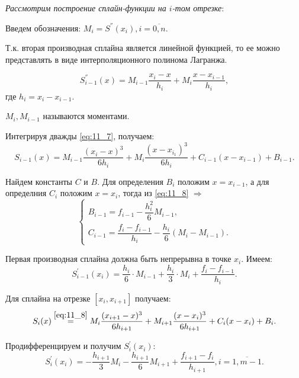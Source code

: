 \textit{Рассмотрим построение сплайн-функции на $i$-том отрезке}:

Введем обозначения: $M_i = S^{''}(x_i), i = \overline{0, n}$.

Т.к. вторая производная сплайна является линейной функцией, то ее можно представлять в виде интерполяционного полинома Лагранжа.

\begin{equation}\label{eq:11_7}
  S^{''}_{i - 1} (x) = M_{i - 1} \dfrac{x_i - x}{h_i} + M_i \dfrac{x - x_{i -1}}{h_i},
\end{equation}
где $h_i = x_i - x_{i - 1}$.

$M_i, M_{i - 1}$ называются моментами.

Интегрируя дважды \eqref{eq:11_7}, получаем:
\begin{equation}\label{eq:11_8}
  S_{i - 1}(x) = M_{i - 1} \dfrac{(x_i - x)^3}{6 h_i} + M_i \dfrac{(x - x_{i_1})^3}{6 h_i} +  C_{i - 1} (x - x_{i - 1}) + B_{i - 1}.
\end{equation}

Найдем константы $C$ и $B$. Для определения $B_i$ положим $x = x_{i - 1}$, а для определния $C_i$ положим $x = x_{i}$, тогда из \eqref{eq:11_8} $\Rightarrow$
\begin{equation*}
  \begin{cases} B_{i - 1} = f_{i - 1} - \dfrac{h_i^2}{6} M_{i - 1}, \\ C_{i - 1} = \dfrac{f_i - f_{i - 1}}{h_i} - \dfrac{h_i}{6}(M_i - M_{i - 1}). \end{cases}
\end{equation*}

Первая производная сплайна должна быть непрерывна в точке $x_i$. Имеем:
\begin{equation}\label{eq:11_9}
  S^{'}_{i - 1}(x_i) = \dfrac{h_i}{6} \cdot M_{i - 1} + \dfrac{h_i}{3} \cdot M_i + \dfrac{f_i - f_{i - 1}}{h_i}.
\end{equation}

Для сплайна на отрезке $[x_i, x_{i+1}]$ получаем:
\begin{equation*}
  S_{i}(x) \overset{\eqref{eq:11_8}}{=} M_i \dfrac{(x_{i+1} - x)^3}{6 h_{i+1}} + M_{i+1} \dfrac{(x - x_i)^3}{6 h_{i+1}} +  C_i (x - x_i) + B_i.
\end{equation*}

Продифференцируем и получим $S^{'}_{i}(x_i)$:
\begin{equation}\label{eq:11_10}
  S^{'}_{i}(x_i) = - \dfrac{h_{i+1}}{3} M_{i}  - \dfrac{h_{i+1}}{6} M_{i+1} + \dfrac{f_{i+1} - f_i}{h_{i+1}}, i = \overline{1, m - 1}.
\end{equation}

